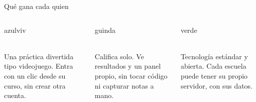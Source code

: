 \begin{frame}{Qu\'e gana cada quien}
\vspace{0.25cm}
\begin{columns}[T]
\begin{tarjetabox}{azulviv}
\begin{center}\end{center}
\\[3pt]
Una pr\'actica divertida tipo videojuego. Entra con un clic desde su curso, sin
crear otra cuenta.
\end{tarjetabox}

\begin{tarjetabox}{guinda}
\begin{center}\end{center}
\\[3pt]
Califica solo. Ve resultados y un panel propio, sin tocar c\'odigo ni capturar
notas a mano.
\end{tarjetabox}

\begin{tarjetabox}{verde}
\begin{center}\end{center}
\\[3pt]
Tecnolog\'ia est\'andar y abierta. Cada escuela puede tener su propio servidor,
con sus datos.
\end{tarjetabox}
\end{columns}
\end{frame}


